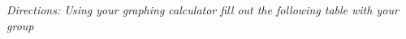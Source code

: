 \documentclass[11pt]{scrartcl}
\theoremstyle{definition}
\begin{document}
\newpage
\thispagestyle{fancy}


\textit{Directions: Using your graphing calculator fill out the following table with your group}

\vspace{0cm}




%


\end{document}
